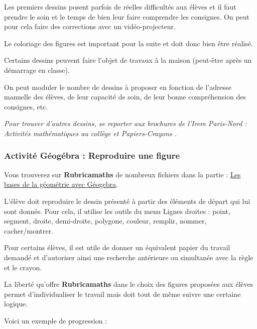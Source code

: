 Les premiers dessins posent parfois de réelles difficultés aux élèves et il faut prendre le soin et le temps de bien leur faire comprendre les consignes. On peut pour cela faire des corrections avec un vidéo-projecteur.

Le coloriage des figures est important pour la suite et doit donc bien être réalisé.

Certains dessins peuvent faire l’objet de travaux à la maison (peut-être après un démarrage en classe).

On peut moduler le nombre de dessins à proposer en fonction de l’adresse manuelle des élèves, de leur capacité de soin, de leur bonne compréhension des consignes, etc.

\textit{Pour trouver d’autres dessins, se reporter aux brochures de l’Irem Paris-Nord :  Activités mathématiques au collège\fg{} et \og Papiers-Crayons \fg{}.}

\subsubsection{Activité Géogébra : Reproduire une figure}

Vous trouverez sur \textbf{Rubricamaths} de nombreux fichiers dans la partie : \href{http://www-irem.univ-paris13.fr/site_spip/spip.php?rubrique58}{Les bases de la géométrie avec Géogebra}.

L’élève doit reproduire le dessin présenté à partir des éléments de départ qui lui sont donnés. Pour cela, il utilise les outils du menu \og Lignes droites \fg{} : point, segment, droite, demi-droite, polygone, couleur, remplir, nommer, cacher/montrer.

Pour certains élèves, il est utile de donner un équivalent papier du travail demandé et d’autoriser ainsi une recherche antérieure ou simultanée avec la règle et le crayon.

La liberté qu’offre \textbf{Rubricamaths} dans le choix des figures proposées aux élèves permet d’individualiser le travail mais doit tout de même suivre une certaine logique.

Voici un exemple de progression :

